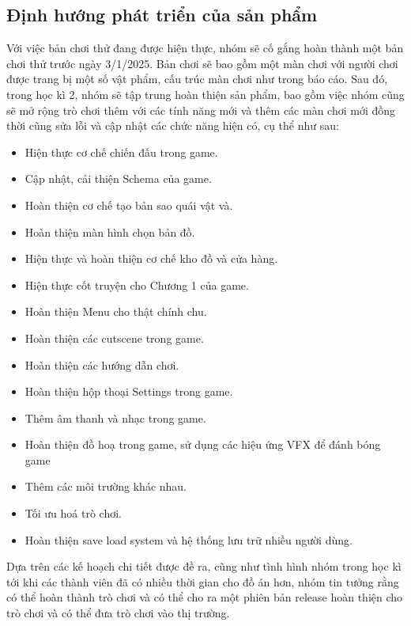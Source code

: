 \subsection{Định hướng phát triển của sản phẩm}
\hspace*{0.5cm} Với việc bản chơi thử đang được hiện thực, nhóm sẽ cố gắng hoàn thành một bản chơi thử trước ngày 3/1/2025. Bản chơi sẽ bao gồm một màn chơi với người chơi được trang bị một số vật phẩm, cấu trúc màn chơi như trong báo cáo. Sau đó, trong học kì 2, nhóm sẽ tập trung hoàn thiện sản phẩm, bao gồm việc nhóm cũng sẽ mở rộng trò chơi thêm với các tính năng mới và thêm các màn chơi mới đồng thời cũng sửa lỗi và cập nhật các chức năng hiện có, cụ thể như sau:
\begin{itemize}
	\item Hiện thực cơ chế chiến đấu trong game.
	\item Cập nhật, cải thiện Schema của game.
	\item Hoàn thiện cơ chế tạo bản sao quái vật và.
	\item Hoàn thiện màn hình chọn bản đồ.
	\item Hiện thực và hoàn thiện cơ chế kho đồ và cửa hàng.
	\item Hiện thực cốt truyện cho Chương 1 của game.
	\item Hoàn thiện Menu cho thật chính chu.
	\item Hoàn thiện các cutscene trong game.
	\item Hoàn thiện các hướng dẫn chơi.
	\item Hoàn thiện hộp thoại Settings trong game.
	\item Thêm âm thanh và nhạc trong game.
	\item Hoàn thiện đồ hoạ trong game, sử dụng các hiệu ứng VFX để đánh bóng game
	\item Thêm các môi trường khác nhau.
	\item Tối ưu hoá trò chơi.
	\item Hoàn thiện save load system và hệ thống lưu trữ nhiều người dùng.
\end{itemize}
\hspace*{0.5cm} Dựa trên các kế hoạch chi tiết được đề ra, cũng như tình hình nhóm trong học kì tới khi các thành viên đã có nhiều thời gian cho đồ án hơn, nhóm tin tưởng rằng có thể hoàn thành trò chơi và có thể cho ra một phiên bản release hoàn thiện cho trò chơi và có thể đưa trò chơi vào thị trường.
